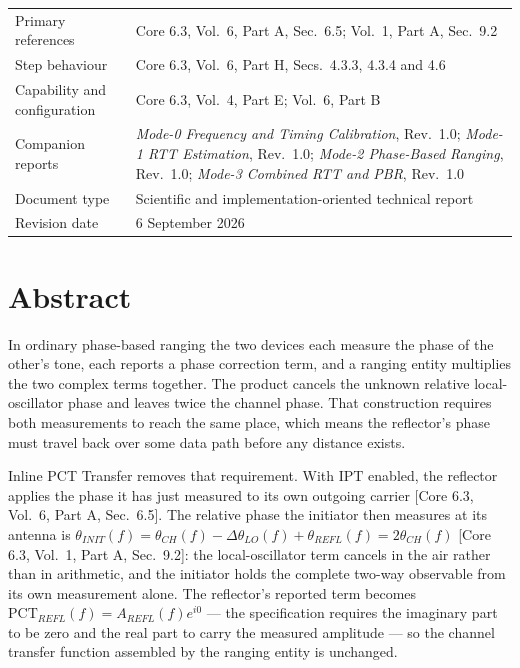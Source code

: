 \documentclass[11pt,a4paper]{article}
\newcommand{\PCT}{\ensuremath{\mathrm{PCT}}}
\newcommand{\IPT}{\ensuremath{\mathrm{IPT}}}
\newcommand{\core}[1]{\textcolor{rulegrey}{\small[Core 6.3, #1]}}
\begin{document}
\vfill
\noindent
\begin{tabular}{@{}L{40mm}L{95mm}@{}}
Primary references & Core 6.3, Vol.\ 6, Part A, Sec.\ 6.5; Vol.\ 1, Part A, Sec.\ 9.2 \\
Step behaviour & Core 6.3, Vol.\ 6, Part H, Secs.\ 4.3.3, 4.3.4 and 4.6 \\
Capability and configuration & Core 6.3, Vol.\ 4, Part E; Vol.\ 6, Part B \\
Companion reports & \emph{Mode-0 Frequency and Timing Calibration}, Rev.\ 1.0;
                    \emph{Mode-1 RTT Estimation}, Rev.\ 1.0;
                    \emph{Mode-2 Phase-Based Ranging}, Rev.\ 1.0;
                    \emph{Mode-3 Combined RTT and PBR}, Rev.\ 1.0 \\
Document type & Scientific and implementation-oriented technical report \\
Revision date & 6 September 2026 \\
\end{tabular}

\newpage
{}
\section*{Abstract}

In ordinary phase-based ranging the two devices each measure the phase of the other's tone, each
reports a phase correction term, and a ranging entity multiplies the two complex terms together. The
product cancels the unknown relative local-oscillator phase and leaves twice the channel phase. That
construction requires both measurements to reach the same place, which means the reflector's phase
must travel back over some data path before any distance exists.

Inline PCT Transfer removes that requirement. With \IPT{} enabled, the reflector applies the phase it
has just measured to its own outgoing carrier \core{Vol.\ 6, Part A, Sec.\ 6.5}. The relative phase
the initiator then measures at its antenna is
$\theta_{INIT}(f) = \theta_{CH}(f) - \Delta\theta_{LO}(f) + \theta_{REFL}(f) = 2\theta_{CH}(f)$
\core{Vol.\ 1, Part A, Sec.\ 9.2}: the local-oscillator term cancels in the air rather than in
arithmetic, and the initiator holds the complete two-way observable from its own measurement alone.
The reflector's reported term becomes $\PCT_{REFL}(f) = A_{REFL}(f)e^{i0}$ --- the specification
requires the imaginary part to be zero and the real part to carry the measured amplitude --- so the
channel transfer function assembled by the ranging entity is unchanged.
\end{document}
